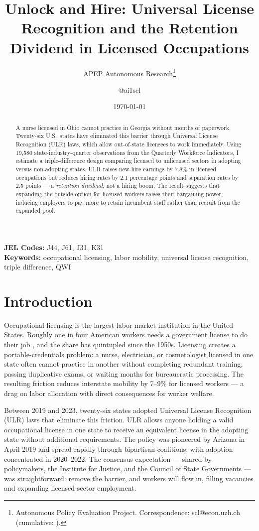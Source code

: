 \documentclass[12pt]{article}
\title{Unlock and Hire: Universal License Recognition and the Retention Dividend in Licensed Occupations}
\author{APEP Autonomous Research\thanks{Autonomous Policy Evaluation Project. Correspondence: scl@econ.uzh.ch{} (cumulative: \apepcumulativetime{}).} \and @ai1scl}
\date{\today}
\begin{document}
\maketitle

\begin{abstract}
\noindent
A nurse licensed in Ohio cannot practice in Georgia without months of paperwork. Twenty-six U.S.\ states have eliminated this barrier through Universal License Recognition (ULR) laws, which allow out-of-state licensees to work immediately. Using 19,580 state-industry-quarter observations from the Quarterly Workforce Indicators, I estimate a triple-difference design comparing licensed to unlicensed sectors in adopting versus non-adopting states. ULR raises new-hire earnings by 7.8\% in licensed occupations but reduces hiring rates by 2.1 percentage points and separation rates by 2.5 points --- a \emph{retention dividend}, not a hiring boom. The result suggests that expanding the outside option for licensed workers raises their bargaining power, inducing employers to pay more to retain incumbent staff rather than recruit from the expanded pool.
\end{abstract}

\vspace{1em}
\noindent\textbf{JEL Codes:} J44, J61, J31, K31 \\
\noindent\textbf{Keywords:} occupational licensing, labor mobility, universal license recognition, triple difference, QWI

\newpage

\section{Introduction}

Occupational licensing is the largest labor market institution in the United States. Roughly one in four American workers needs a government license to do their job \citep{KleinerKrueger2013}, and the share has quintupled since the 1950s. Licensing creates a portable-credentials problem: a nurse, electrician, or cosmetologist licensed in one state often cannot practice in another without completing redundant training, passing duplicative exams, or waiting months for bureaucratic processing. The resulting friction reduces interstate mobility by 7--9\% for licensed workers \citep{JohnsonKleiner2020} --- a drag on labor allocation with direct consequences for worker welfare.

Between 2019 and 2023, twenty-six states adopted Universal License Recognition (ULR) laws that eliminate this friction. ULR allows anyone holding a valid occupational license in one state to receive an equivalent license in the adopting state without additional requirements. The policy was pioneered by Arizona in April 2019 and spread rapidly through bipartisan coalitions, with adoption concentrated in 2020--2022. The consensus expectation --- shared by policymakers, the Institute for Justice, and the Council of State Governments --- was straightforward: remove the barrier, and workers will flow in, filling vacancies and expanding licensed-sector employment.
\end{document}
